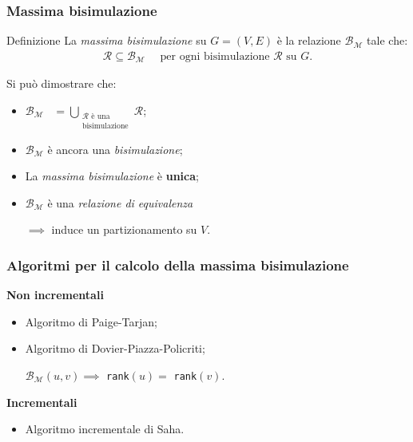 \documentclass{beamer}
\begin{document}
\begin{frame}\frametitle{Massima bisimulazione}
    \begin{block}{Definizione}
        La \emph{massima bisimulazione} su $G = (V,E)$ è la relazione $\mathcal{B}_\mathcal{M}$ tale che:
        \begin{gather*}
            \mathcal{R} \subseteq \mathcal{B}_\mathcal{M} \quad \text{ per ogni bisimulazione } \mathcal{R} \text{ su } G.
        \end{gather*}
    \end{block}

    \bigskip\bigskip

    Si può dimostrare che:
    \begin{itemize}
        \item $\displaystyle \mathcal{B}_\mathcal{M} \,\,\,\,\,= \bigcup_{\substack{\mathcal{R} \text{ è una}\\\text{bisimulazione}}} \mathcal{R}$;
        \item $\mathcal{B}_\mathcal{M}$ è ancora una \emph{bisimulazione};
        \item La \emph{massima bisimulazione} è \textbf{unica};
        \item $\mathcal{B}_\mathcal{M}$ è una \emph{relazione di equivalenza}

        $\implies$ induce un partizionamento su $V$.
    \end{itemize}
\end{frame}

\begin{frame}\frametitle{Algoritmi per il calcolo della massima bisimulazione}
    \textbf{Non incrementali}
    \begin{itemize}
        \item Algoritmo di Paige-Tarjan;
        \item Algoritmo di Dovier-Piazza-Policriti;

        \qquad $\mathcal{B}_\mathcal{M}(u,v) \implies$ \texttt{rank}$(u) =$ \texttt{rank}$(v)$.
    \end{itemize}

    \bigskip

    \textbf{Incrementali}
    \begin{itemize}
        \item Algoritmo incrementale di Saha.
    \end{itemize}
\end{frame}
\end{document}

